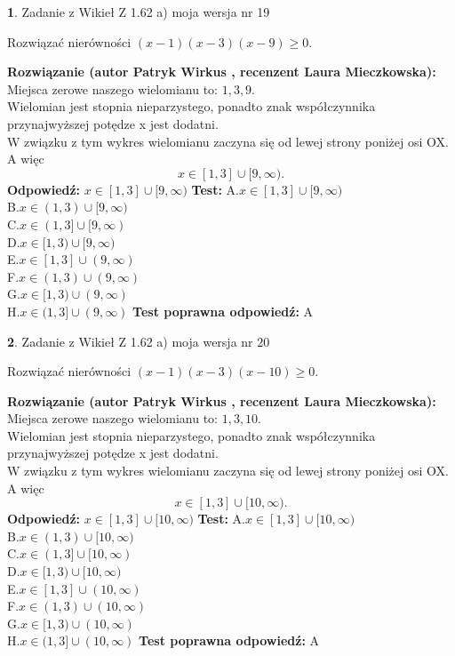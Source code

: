 \documentclass[12pt, a4paper]{article}
\theoremstyle{definition} %
\newtheorem{zad}{}
\newcommand{\zadStart}[1]{\begin{zad}#1\newline}
\newcommand{\zadStop}{\end{zad}}
\newcommand{\rozwStart}[2]{\noindent \textbf{Rozwiązanie (autor #1 , recenzent #2): }\newline}
\newcommand{\rozwStop}{\newline}
\newcommand{\odpStart}{\noindent \textbf{Odpowiedź:}\newline}
\newcommand{\odpStop}{\newline}
\newcommand{\testStart}{\noindent \textbf{Test:}\newline}
\newcommand{\testStop}{\newline}
\newcommand{\kluczStart}{\noindent \textbf{Test poprawna odpowiedź:}\newline}
\newcommand{\kluczStop}{\newline}
\begin{document}
\zadStart{Zadanie z Wikieł Z 1.62 a) moja wersja nr 19}

Rozwiązać nierówności $(x-1)(x-3)(x-9)\ge0$.
\zadStop
\rozwStart{Patryk Wirkus}{Laura Mieczkowska}
Miejsca zerowe naszego wielomianu to: $1, 3, 9$.\\
Wielomian jest stopnia nieparzystego, ponadto znak współczynnika przy\linebreak najwyższej potędze x jest dodatni.\\ W związku z tym wykres wielomianu zaczyna się od lewej strony poniżej osi OX. A więc $$x \in [1,3] \cup [9,\infty).$$
\rozwStop
\odpStart
$x \in [1,3] \cup [9,\infty)$
\odpStop
\testStart
A.$x \in [1,3] \cup [9,\infty)$\\
B.$x \in (1,3) \cup [9,\infty)$\\
C.$x \in (1,3] \cup [9,\infty)$\\
D.$x \in [1,3) \cup [9,\infty)$\\
E.$x \in [1,3] \cup (9,\infty)$\\
F.$x \in (1,3) \cup (9,\infty)$\\
G.$x \in [1,3) \cup (9,\infty)$\\
H.$x \in (1,3] \cup (9,\infty)$
\testStop
\kluczStart
A
\kluczStop



\zadStart{Zadanie z Wikieł Z 1.62 a) moja wersja nr 20}

Rozwiązać nierówności $(x-1)(x-3)(x-10)\ge0$.
\zadStop
\rozwStart{Patryk Wirkus}{Laura Mieczkowska}
Miejsca zerowe naszego wielomianu to: $1, 3, 10$.\\
Wielomian jest stopnia nieparzystego, ponadto znak współczynnika przy\linebreak najwyższej potędze x jest dodatni.\\ W związku z tym wykres wielomianu zaczyna się od lewej strony poniżej osi OX. A więc $$x \in [1,3] \cup [10,\infty).$$
\rozwStop
\odpStart
$x \in [1,3] \cup [10,\infty)$
\odpStop
\testStart
A.$x \in [1,3] \cup [10,\infty)$\\
B.$x \in (1,3) \cup [10,\infty)$\\
C.$x \in (1,3] \cup [10,\infty)$\\
D.$x \in [1,3) \cup [10,\infty)$\\
E.$x \in [1,3] \cup (10,\infty)$\\
F.$x \in (1,3) \cup (10,\infty)$\\
G.$x \in [1,3) \cup (10,\infty)$\\
H.$x \in (1,3] \cup (10,\infty)$
\testStop
\kluczStart
A
\kluczStop
\end{document}
